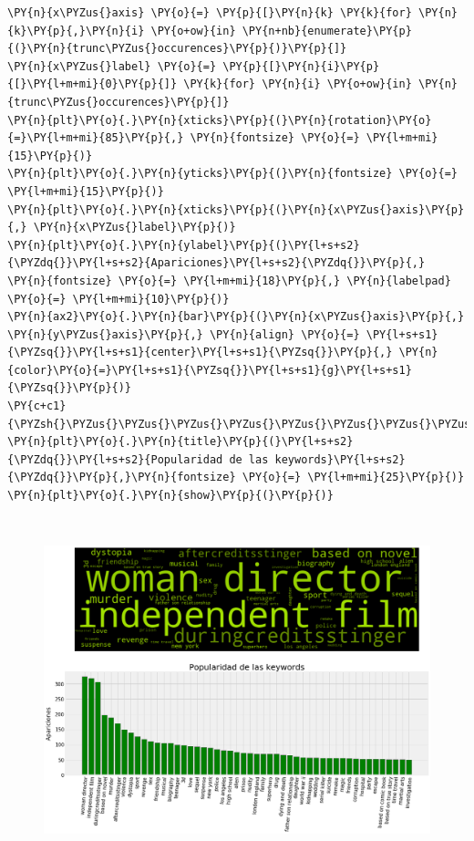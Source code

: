 \begin{tcolorbox}[breakable, size=fbox, boxrule=1pt, pad at break*=1mm,colback=cellbackground, colframe=cellborder]
\begin{Verbatim}[commandchars=\\\{\}]
\PY{n}{x\PYZus{}axis} \PY{o}{=} \PY{p}{[}\PY{n}{k} \PY{k}{for} \PY{n}{k}\PY{p}{,}\PY{n}{i} \PY{o+ow}{in} \PY{n+nb}{enumerate}\PY{p}{(}\PY{n}{trunc\PYZus{}occurences}\PY{p}{)}\PY{p}{]}
\PY{n}{x\PYZus{}label} \PY{o}{=} \PY{p}{[}\PY{n}{i}\PY{p}{[}\PY{l+m+mi}{0}\PY{p}{]} \PY{k}{for} \PY{n}{i} \PY{o+ow}{in} \PY{n}{trunc\PYZus{}occurences}\PY{p}{]}
\PY{n}{plt}\PY{o}{.}\PY{n}{xticks}\PY{p}{(}\PY{n}{rotation}\PY{o}{=}\PY{l+m+mi}{85}\PY{p}{,} \PY{n}{fontsize} \PY{o}{=} \PY{l+m+mi}{15}\PY{p}{)}
\PY{n}{plt}\PY{o}{.}\PY{n}{yticks}\PY{p}{(}\PY{n}{fontsize} \PY{o}{=} \PY{l+m+mi}{15}\PY{p}{)}
\PY{n}{plt}\PY{o}{.}\PY{n}{xticks}\PY{p}{(}\PY{n}{x\PYZus{}axis}\PY{p}{,} \PY{n}{x\PYZus{}label}\PY{p}{)}
\PY{n}{plt}\PY{o}{.}\PY{n}{ylabel}\PY{p}{(}\PY{l+s+s2}{\PYZdq{}}\PY{l+s+s2}{Apariciones}\PY{l+s+s2}{\PYZdq{}}\PY{p}{,} \PY{n}{fontsize} \PY{o}{=} \PY{l+m+mi}{18}\PY{p}{,} \PY{n}{labelpad} \PY{o}{=} \PY{l+m+mi}{10}\PY{p}{)}
\PY{n}{ax2}\PY{o}{.}\PY{n}{bar}\PY{p}{(}\PY{n}{x\PYZus{}axis}\PY{p}{,} \PY{n}{y\PYZus{}axis}\PY{p}{,} \PY{n}{align} \PY{o}{=} \PY{l+s+s1}{\PYZsq{}}\PY{l+s+s1}{center}\PY{l+s+s1}{\PYZsq{}}\PY{p}{,} \PY{n}{color}\PY{o}{=}\PY{l+s+s1}{\PYZsq{}}\PY{l+s+s1}{g}\PY{l+s+s1}{\PYZsq{}}\PY{p}{)}
\PY{c+c1}{\PYZsh{}\PYZus{}\PYZus{}\PYZus{}\PYZus{}\PYZus{}\PYZus{}\PYZus{}\PYZus{}\PYZus{}\PYZus{}\PYZus{}\PYZus{}\PYZus{}\PYZus{}\PYZus{}\PYZus{}\PYZus{}\PYZus{}\PYZus{}\PYZus{}\PYZus{}\PYZus{}\PYZus{}}
\PY{n}{plt}\PY{o}{.}\PY{n}{title}\PY{p}{(}\PY{l+s+s2}{\PYZdq{}}\PY{l+s+s2}{Popularidad de las keywords}\PY{l+s+s2}{\PYZdq{}}\PY{p}{,}\PY{n}{fontsize} \PY{o}{=} \PY{l+m+mi}{25}\PY{p}{)}
\PY{n}{plt}\PY{o}{.}\PY{n}{show}\PY{p}{(}\PY{p}{)}
\end{Verbatim}
\end{tcolorbox}

\begin{figure}[h]
    \centering
    \captionsetup{width=10cm}
    \includegraphics[height=10cm]{./contenido/imagenes/output_17_0.png}
\end{figure}
    { \hspace*{\fill} \\}
    
